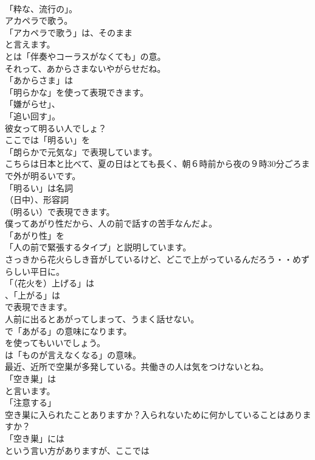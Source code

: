 \documentclass[8pt]{extreport}
\begin{document}
\begin{CJK}{UTF8}{min}
\\	「粋な、流行の」。	
\\	アカペラで歌う。 
\\	「アカペラで歌う」は、そのまま
\\	と言えます。
\\	とは「伴奏やコーラスがなくても」の意。	
\\	それって、あからさまないやがらせだね。 
\\	「あからさま」は
\\	「明らかな」を使って表現できます。
\\	「嫌がらせ」、
\\	「追い回す」。	
\\	彼女って明るい人でしょ？ 
\\	ここでは「明るい」を
\\	「朗らかで元気な」で表現しています。	
\\	こちらは日本と比べて、夏の日はとても長く、朝６時前から夜の９時30分ごろまで外が明るいです。 
\\	「明るい」は名詞 
\\	（日中）、形容詞 
\\	（明るい）で表現できます。	
\\	僕ってあがり性だから、人の前で話すの苦手なんだよ。 
\\	「あがり性」を
\\	「人の前で緊張するタイプ」と説明しています。	
\\	さっきから花火らしき音がしているけど、どこで上がっているんだろう・・めずらしい平日に。 
\\	「（花火を）上げる」は
\\	、「上がる」は
\\	で表現できます。	
\\	人前に出るとあがってしまって、うまく話せない。 
\\	で「あがる」の意味になります。
\\	を使ってもいいでしょう。
\\	は「ものが言えなくなる」の意味。	
\\	最近、近所で空巣が多発している。共働きの人は気をつけないとね。 
\\	「空き巣」は
\\	と言います。
\\	「注意する」	
\\	空き巣に入られたことありますか？入られないために何かしていることはありますか？ 
\\	「空き巣」には 
\\	という言い方がありますが、ここでは 

\end{CJK}
\end{document}
